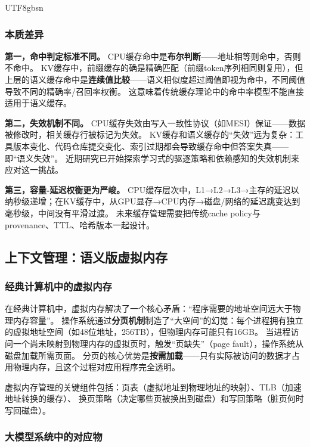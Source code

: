 \documentclass[11pt,a4paper]{article}
\begin{document}
\begin{CJK*}{UTF8}{gbsn}
\subsubsection{本质差异}

\textbf{第一，命中判定标准不同。}
CPU缓存命中是\textbf{布尔判断}——地址相等则命中，否则不命中。
KV缓存中，前缀缓存的确是精确匹配（前缀token序列相同则复用），但上层的语义缓存命中是\textbf{连续值比较}——语义相似度超过阈值即视为命中，不同阈值导致不同的精确率/召回率权衡。
这意味着传统缓存理论中的命中率模型不能直接适用于语义缓存。

\textbf{第二，失效机制不同。}
CPU缓存失效由写入一致性协议（如MESI）保证——数据被修改时，相关缓存行被标记为失效。
KV缓存和语义缓存的``失效''远为复杂：工具版本变化、代码仓库提交变化、索引过期都会导致缓存命中但答案失真——即``语义失效''。
近期研究已开始探索学习式的驱逐策略\cite{lpc2025}和依赖感知的失效机制\cite{multilevelcache2025}来应对这一挑战。

\textbf{第三，容量-延迟权衡更为严峻。}
CPU缓存层次中，L1→L2→L3→主存的延迟以纳秒级递增；在KV缓存中，从GPU显存→CPU内存→磁盘/网络的延迟跳变达到毫秒级，中间没有平滑过渡。
未来缓存管理需要把传统cache policy与provenance、TTL、哈希版本一起设计。

\subsection{上下文管理：语义版虚拟内存}
\label{sec:memory}

\subsubsection{经典计算机中的虚拟内存}

在经典计算机中，虚拟内存解决了一个核心矛盾：``程序需要的地址空间远大于物理内存容量''。
操作系统通过\textbf{分页机制}制造了``大空间''的幻觉：每个进程拥有独立的虚拟地址空间（如48位地址，256TB），但物理内存可能只有16GB。
当进程访问一个尚未映射到物理内存的虚拟页时，触发``页缺失''（page fault），操作系统从磁盘加载所需页面。
分页的核心优势是\textbf{按需加载}——只有实际被访问的数据才占用物理内存，且这个过程对应用程序完全透明。

虚拟内存管理的关键组件包括：页表（虚拟地址到物理地址的映射）、TLB（加速地址转换的缓存）、
换页策略（决定哪些页被换出到磁盘）和写回策略（脏页何时写回磁盘）\cite{ostep_2023}。

\subsubsection{大模型系统中的对应物}


\end{CJK*}
\end{document}
